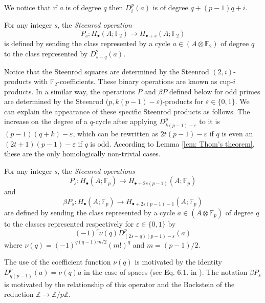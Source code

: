 We notice that if $a$ is of degree $q$ then $D^p_i(a)$ is of degree $q + (p-1)q + i$.

\begin{definition}
	For any integer $s$, the \textit{Steenrod operation}
	\begin{equation*}
	P_s : H_\bullet(A; \mathbb{F}_2) \to H_{\bullet + s}(A; \mathbb{F}_2)
	\end{equation*}
	is defined by sending the class represented by a cycle $a \in (A \otimes \mathbb{F}_2)$ of degree $q$ to the class represented by $D^2_{s-q}(a)$.
\end{definition}

Notice that the Steenrod squares are determined by the Steenrod $(2,i)$-products with $\mathbb{F}_2$-coefficients. These binary operations are known as cup-$i$ products. In a similar way, the operations $P$ and $\beta P$ defined below for odd primes are determined by the Steenrod $\big(p, k(p-1)-\varepsilon\big)$-products for $\varepsilon \in \{0,1\}$. We can explain the appearance of these specific Steenrod products as follows. The increase on the degree of a $q$-cycle after applying $D^p_{k(p-1)-\varepsilon}$ to it is $(p-1)(q+k) - \varepsilon$, which can be rewritten as $2t(p-1) - \varepsilon$ if $q$ is even an $(2t+1)(p-1) - \varepsilon$ if $q$ is odd. According to Lemma \ref{lem: Thom's theorem}, these are the only homologically non-trivial cases.

\begin{definition} \label{def: Steenrod operations at odd prime}
	For any integer $s$, the \textit{Steenrod operations}
	\begin{equation*}
	P_s : H_\bullet(A; \mathbb{F}_p) \to H_{\bullet + 2s(p-1)}(A; \mathbb{F}_p)
	\end{equation*}
	and
	\begin{equation*}
	\beta P_s : H_\bullet(A; \mathbb{F}_p) \to H_{\bullet + 2s(p-1) - 1}(A; \mathbb{F}_p)
	\end{equation*}
	are defined by sending the class represented by a cycle $a \in (A \otimes \mathbb{F}_p)$ of degree $q$ to the classes represented respectively for $\varepsilon \in\{0,1\}$ by
	\begin{equation*}
	(-1)^s \nu(q) D^p_{(2s-q)(p-1)-\varepsilon}(a)
	\end{equation*}
	where $\nu(q) = (-1)^{q(q-1)m/2}(m!)^q$ and $m = (p-1)/2$.
\end{definition}

\begin{remark}
	The use of the coefficient function $\nu(q)$ is motivated by the identity $D_{q(p-1)}^p(a) = \nu(q)a$ in the case of spaces (see Eq. 6.1. in \cite{steenrod53cyclic}). The notation $\beta P_s$ is motivated by the relationship of this operator and the Bockstein of the reduction $\mathbb Z \to \mathbb Z/p\mathbb Z$.
\end{remark}

